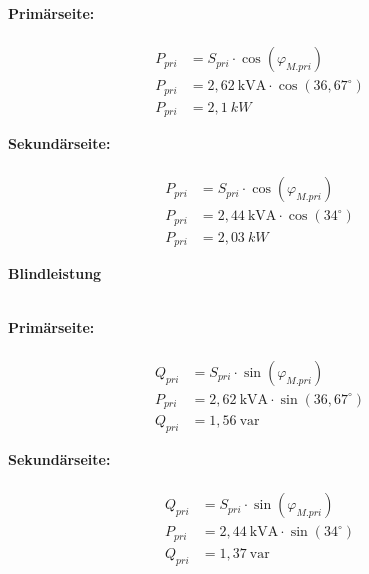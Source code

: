 \begin{enumerate}[label=\alph*)]
\begin{tcolorbox}[colback=gray!30,
			      colframe=black,
			      width=0.9\textwidth,
		      ]
{			      \begin{minipage}{0.5\textwidth}
				      \textbf{Primärseite:}\\ \ \\
				      \begin{align*}
					      P_{pri} & = S_{pri} \cdot \cos(\varphi_{M.pri})      \\
					      P_{pri} & = 2,62\ \text{kVA} \cdot \cos(36,67^\circ) \\
					      P_{pri} & = 2,1\ kW
				      \end{align*}
			      \end{minipage}\hfill
			      \begin{minipage}{0.5\textwidth}
				      \textbf{Sekundärseite:}\\ \ \\
				      \begin{align*}
					      P_{pri} & = S_{pri} \cdot \cos(\varphi_{M.pri})   \\
					      P_{pri} & = 2,44\ \text{kVA} \cdot \cos(34^\circ) \\
					      P_{pri} & = 2,03\ kW
				      \end{align*}
			      \end{minipage}
		      }
	      \end{tcolorbox}

	      \textbf{Blindleistung}\\ \ \\
	      \begin{tcolorbox}[colback=gray!30,
			      colframe=black,
			      width=0.9\textwidth,
		      ]
		      \parbox{\textwidth}{

			      \begin{minipage}{0.5\textwidth}
				      \textbf{Primärseite:}\\ \ \\
				      \begin{align*}
					      Q_{pri} & = S_{pri} \cdot \sin(\varphi_{M.pri})      \\
					      P_{pri} & = 2,62\ \text{kVA} \cdot \sin(36,67^\circ) \\
					      Q_{pri} & = 1,56\ \text{var}
				      \end{align*}
			      \end{minipage}\hfill
			      \begin{minipage}{0.5\textwidth}
				      \textbf{Sekundärseite:}\\ \ \\
				      \begin{align*}
					      Q_{pri} & = S_{pri} \cdot \sin(\varphi_{M.pri})   \\
					      P_{pri} & = 2,44\ \text{kVA} \cdot \sin(34^\circ) \\
					      Q_{pri} & = 1,37\ \text{var}
				      \end{align*}
			      \end{minipage}
		      }
	      \end{tcolorbox}


\end{enumerate}
